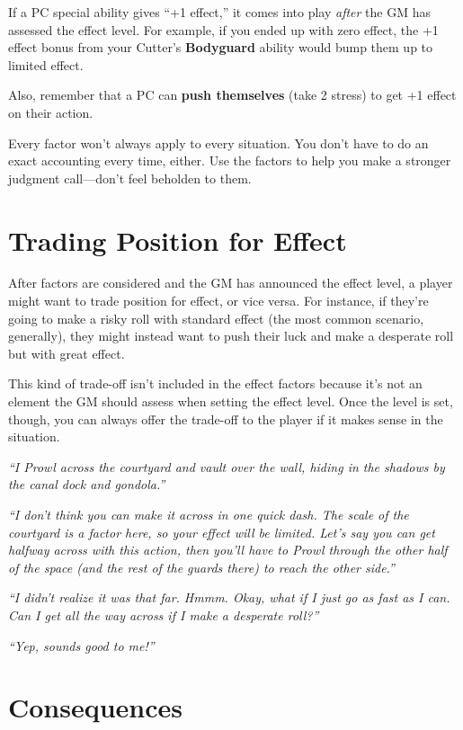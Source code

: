 \documentclass[11pt,oneside]{book}
\newcommand{\gameterm}[1]{\textbf{#1}}
\begin{document}
If a PC special ability gives “+1 effect,” it comes into play \emph{after} the GM has assessed the effect level. For example, if you ended up with zero effect, the +1 effect bonus from your Cutter’s \gameterm{Bodyguard}  ability would bump them up to limited effect.

Also, remember that a PC can \textbf{push themselves} (take 2 stress) to get +1 effect on their action.

Every factor won’t always apply to every situation. You don’t have to do an exact accounting every time, either. Use the factors to help you make a stronger judgment call---don’t feel beholden to them.

\section{Trading Position for Effect}

After factors are considered and the GM has announced the effect level, a player might want to trade position for effect, or vice versa. For instance, if they’re going to make a risky roll with standard effect (the most common scenario, generally), they might instead want to push their luck and make a desperate roll but with great effect.

This kind of trade-off isn’t included in the effect factors because it’s not an element the GM should assess when setting the effect level. Once the level is set, though, you can always offer the trade-off to the player if it makes sense in the situation.

\emph{“I Prowl across the courtyard and vault over the wall, hiding in the shadows by the canal dock and gondola.”}

\emph{“I don’t think you can make it across in one quick dash. The scale of the courtyard is a factor here, so your effect will be limited. Let’s say you can get halfway across with this action, then you’ll have to Prowl through the other half of the space (and the rest of the guards there) to reach the other side.”}

\emph{“I didn’t realize it was that far. Hmmm. Okay, what if I just go as fast as I can. Can I get all the way across if I make a desperate roll?”}

\emph{“Yep, sounds good to me!”}

\section{Consequences}
\end{document}

